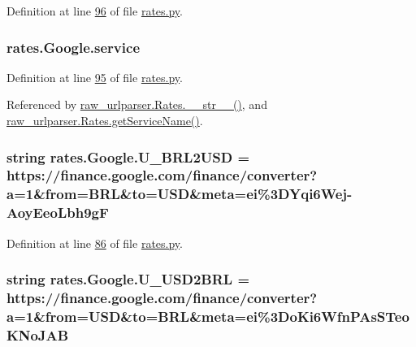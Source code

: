 Definition at line \hyperlink{rates_8py_source_l00096}{96} of file \hyperlink{rates_8py_source}{rates.\+py}.

\subsubsection[{\texorpdfstring{service}{service}}]{\setlength{\rightskip}{0pt plus 5cm}rates.\+Google.\+service}\hypertarget{classrates_1_1_google_a1da08e36d5007aa5293d048b625a35e9}{}\label{classrates_1_1_google_a1da08e36d5007aa5293d048b625a35e9}


Definition at line \hyperlink{rates_8py_source_l00095}{95} of file \hyperlink{rates_8py_source}{rates.\+py}.



Referenced by \hyperlink{raw__urlparser_8py_source_l00038}{raw\+\_\+urlparser.\+Rates.\+\_\+\+\_\+str\+\_\+\+\_\+()}, and \hyperlink{raw__urlparser_8py_source_l00035}{raw\+\_\+urlparser.\+Rates.\+get\+Service\+Name()}.

\subsubsection[{\texorpdfstring{U\+\_\+\+B\+R\+L2\+U\+SD}{U_BRL2USD}}]{\setlength{\rightskip}{0pt plus 5cm}string rates.\+Google.\+U\+\_\+\+B\+R\+L2\+U\+SD = \textquotesingle{}https\+://finance.\+google.\+com/finance/converter?a=1\&from=B\+RL\&to=U\+SD\&meta=ei\%3\+D\+Yqi6\+Wej-\/\+Aoy\+Eeo\+Lbh9g\+F\textquotesingle{}\hspace{0.3cm}{\ttfamily [static]}}\hypertarget{classrates_1_1_google_a46dbc3fa0a110bf5b66808c29642cfa1}{}\label{classrates_1_1_google_a46dbc3fa0a110bf5b66808c29642cfa1}


Definition at line \hyperlink{rates_8py_source_l00086}{86} of file \hyperlink{rates_8py_source}{rates.\+py}.

\subsubsection[{\texorpdfstring{U\+\_\+\+U\+S\+D2\+B\+RL}{U_USD2BRL}}]{\setlength{\rightskip}{0pt plus 5cm}string rates.\+Google.\+U\+\_\+\+U\+S\+D2\+B\+RL = \textquotesingle{}https\+://finance.\+google.\+com/finance/converter?a=1\&from=U\+SD\&to=B\+RL\&meta=ei\%3\+Do\+Ki6\+Wfn\+P\+As\+S\+Teo\+K\+No\+J\+A\+B\textquotesingle{}\hspace{0.3cm}{\ttfamily [static]}}\hypertarget{classrates_1_1_google_a77ef7f5932c48b002697fb187a234d4a}{}\label{classrates_1_1_google_a77ef7f5932c48b002697fb187a234d4a}


